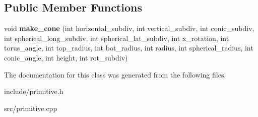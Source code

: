 \subsection*{Public Member Functions}
\begin{DoxyCompactItemize}
\item 
\mbox{\label{classcone_adabf8f53de11b1308195a662f6bc5d19}} 
void {\bfseries make\+\_\+cone} (int horizontal\+\_\+subdiv, int vertical\+\_\+subdiv, int conic\+\_\+subdiv, int spherical\+\_\+long\+\_\+subdiv, int spherical\+\_\+lat\+\_\+subdiv, int x\+\_\+rotation, int torus\+\_\+angle, int top\+\_\+radius, int bot\+\_\+radius, int radius, int spherical\+\_\+radius, int conic\+\_\+angle, int height, int rot\+\_\+subdiv)
\end{DoxyCompactItemize}


The documentation for this class was generated from the following files\+:\begin{DoxyCompactItemize}
\item 
include/primitive.\+h\item 
src/primitive.\+cpp\end{DoxyCompactItemize}
